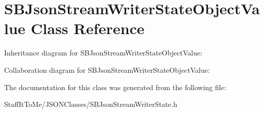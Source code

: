 \hypertarget{interface_s_b_json_stream_writer_state_object_value}{
\section{\-S\-B\-Json\-Stream\-Writer\-State\-Object\-Value \-Class \-Reference}
\label{interface_s_b_json_stream_writer_state_object_value}
}


\-Inheritance diagram for \-S\-B\-Json\-Stream\-Writer\-State\-Object\-Value\-:


\-Collaboration diagram for \-S\-B\-Json\-Stream\-Writer\-State\-Object\-Value\-:


\-The documentation for this class was generated from the following file\-:\begin{DoxyCompactItemize}
\item 
\-Staff\-It\-To\-Me/\-J\-S\-O\-N\-Classes/\-S\-B\-Json\-Stream\-Writer\-State.\-h\end{DoxyCompactItemize}
